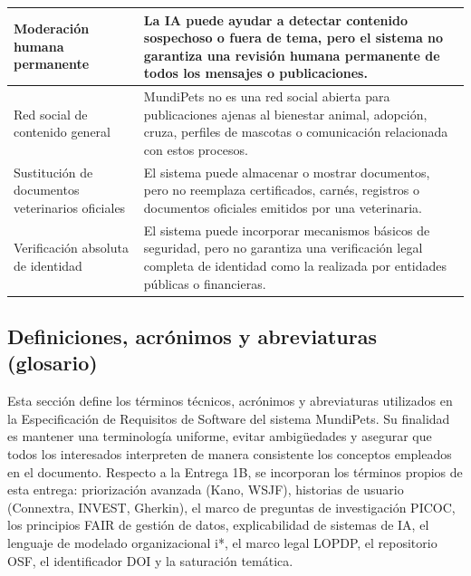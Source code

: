 \documentclass[journal,onecolumn]{IEEEtran}
\begin{document}
\begin{longtable}{|p{4cm}|p{11cm}|}
		\hline
		Moderación humana permanente & La IA puede ayudar a detectar contenido sospechoso o fuera de tema, pero el sistema no garantiza una revisión humana permanente de todos los mensajes o publicaciones. \\
		\hline
		Red social de contenido general & MundiPets no es una red social abierta para publicaciones ajenas al bienestar animal, adopción, cruza, perfiles de mascotas o comunicación relacionada con estos procesos. \\
		\hline
		Sustitución de documentos veterinarios oficiales & El sistema puede almacenar o mostrar documentos, pero no reemplaza certificados, carnés, registros o documentos oficiales emitidos por una veterinaria. \\
		\hline
		Verificación absoluta de identidad & El sistema puede incorporar mecanismos básicos de seguridad, pero no garantiza una verificación legal completa de identidad como la realizada por entidades públicas o financieras. \\
		\hline
	\end{longtable}
	
	\subsection{Definiciones, acrónimos y abreviaturas (glosario)}
	\label{sec:glosario}
	
	Esta sección define los términos técnicos, acrónimos y abreviaturas utilizados
	en la Especificación de Requisitos de Software del sistema MundiPets. Su
	finalidad es mantener una terminología uniforme, evitar ambigüedades y
	asegurar que todos los interesados interpreten de manera consistente los
	conceptos empleados en el documento. Respecto a la Entrega 1B, se incorporan
	los términos propios de esta entrega: priorización avanzada (Kano, WSJF),
	historias de usuario (Connextra, INVEST, Gherkin), el marco de preguntas de
	investigación PICOC, los principios FAIR de gestión de datos, explicabilidad
	de sistemas de IA, el lenguaje de modelado organizacional i*, el marco legal
	LOPDP, el repositorio OSF, el identificador DOI y la saturación temática.
	
\end{document}
